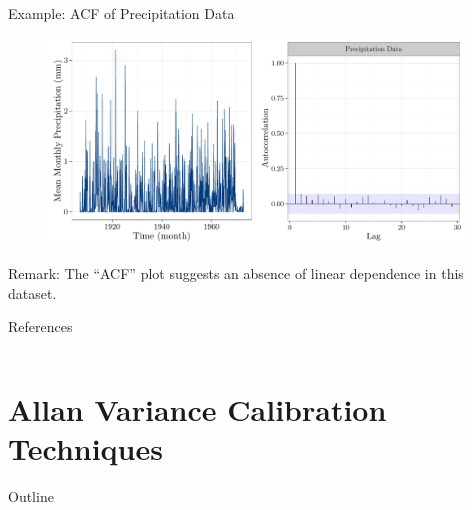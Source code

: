 \documentclass[envcountsect,usenames,dvipsnames]{beamer}
\theoremstyle{mystyle}
\renewcommand*{\bibfont}{\scriptsize}
\begin{document}
\begin{frame}{Example: ACF of Precipitation Data}
	
	\begin{figure}
	    \centering
	  \includegraphics[width = 11cm]{Images/precip2}
	\end{figure}
	
	\vspace{-0.3cm}
	
	\begin{exampleblock}{Remark:}
		The ``ACF'' plot suggests an absence of linear dependence in this dataset.
	\end{exampleblock}
\end{frame}

\renewcommand*{\bibfont}{\small}

\begin{frame}{References}
\begin{columns}
\column{0.85\paperwidth}
\printbibliography[section=3, heading = Ref]
\end{columns}
\end{frame}

\section{Allan Variance Calibration Techniques}\newrefsection

\begin{frame}{Outline}
\small
\begin{multicols}{2}
  \tableofcontents[currentsection]
\end{multicols}
\end{frame}


\end{document}
